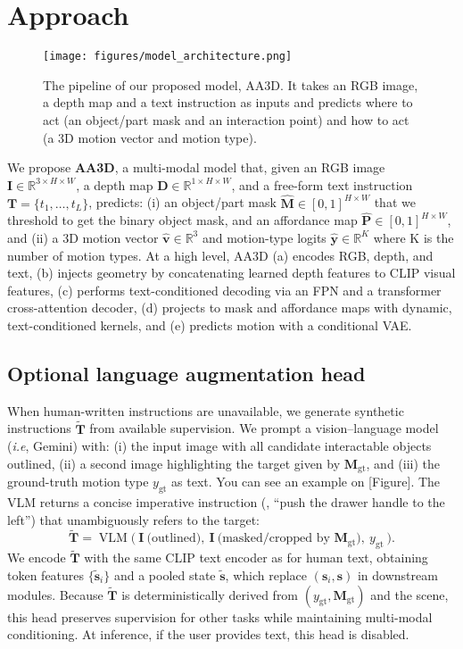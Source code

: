 \section{Approach}
\label{sec:approach}

\begin{figure*}[t]
  \centering
  \texttt{[image: figures/model\_architecture.png]}
  \caption{The pipeline of our proposed model, AA3D. It takes an RGB image, a depth map and a text instruction as inputs and predicts where to act (an object/part mask and an interaction point) and how to act (a 3D motion vector and motion type).}
  \label{fig:pipeline}
\end{figure*}

We propose \textbf{AA3D}, a multi-modal model that, given an RGB image $\mathbf{I}\!\in\!\mathbb{R}^{3\times H\times W}$, a depth map $\mathbf{D}\!\in\!\mathbb{R}^{1\times H\times W}$, and a free-form text instruction $\mathbf{T}\!=\!\{t_1,\dots,t_L\}$, predicts: (i) an object/part mask $\hat{\mathbf{M}}\!\in\![0,1]^{H\times W}$ that we threshold to get the binary object mask, and an affordance map $\hat{\mathbf{P}}\!\in\![0,1]^{H\times W}$, and (ii) a 3D motion vector $\hat{\mathbf{v}}\!\in\!\mathbb{R}^3$ and motion-type logits $\hat{\mathbf{y}}\!\in\!\mathbb{R}^K$ where K is the number of motion types. At a high level, AA3D (a) encodes RGB, depth, and text, (b) injects geometry by concatenating learned depth features to CLIP visual features, (c) performs text-conditioned decoding via an FPN and a transformer cross-attention decoder, (d) projects to mask and affordance maps with dynamic, text-conditioned kernels, and (e) predicts motion with a conditional VAE.

\subsection{Optional language augmentation head}

When human-written instructions are unavailable, we generate synthetic instructions $\tilde{\mathbf{T}}$ from available supervision. We prompt a vision–language model (\emph{i.e}, Gemini) with: (i) the input image with all candidate interactable objects outlined, (ii) a second image highlighting the target given by $\mathbf{M}_{\text{gt}}$, and (iii) the ground-truth motion type $y_{\text{gt}}$ as text. You can see an example on [Figure]. The VLM returns a concise imperative instruction (\eg, ``push the drawer handle to the left'') that unambiguously refers to the target:
\[
\tilde{\mathbf{T}}=\operatorname{VLM}\!\Big(\ \mathbf{I}\ \text{(outlined)},\ \mathbf{I}\ \text{(masked/cropped by }\mathbf{M}_{\text{gt}}\text{)},\ y_{\text{gt}}\ \Big).
\]
We encode $\tilde{\mathbf{T}}$ with the same CLIP text encoder as for human text, obtaining token features $\{\tilde{\mathbf{s}}_i\}$ and a pooled state $\tilde{\mathbf{s}}$, which replace $(\mathbf{s}_i,\mathbf{s})$ in downstream modules. Because $\tilde{\mathbf{T}}$ is deterministically derived from $(y_{\text{gt}},\mathbf{M}_{\text{gt}})$ and the scene, this head preserves supervision for other tasks while maintaining multi-modal conditioning. At inference, if the user provides text, this head is disabled.

